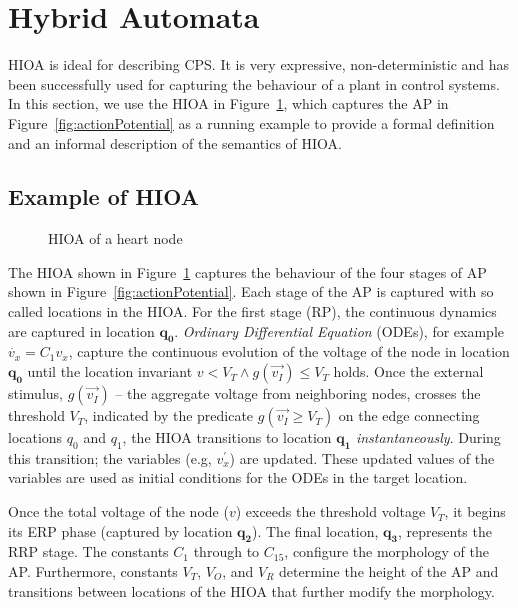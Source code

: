 \section{Hybrid Automata}
\label{sec:HA}


\acf{HIOA} is ideal for describing \ac{CPS}. It is very expressive,
non-deterministic and has been successfully used for capturing the
behaviour of a plant in control systems.  In this section, we use the
\ac{HIOA} in Figure~\ref{fig:heartCellHA}, which captures the \ac{AP} in
Figure~\ref{fig:actionPotential} as a running example to provide a
formal definition and an informal description of the semantics of
\ac{HIOA}.



\subsection{Example of \acf{HIOA} }

\begin{figure}
  \centering
  
  \caption{\acf{HIOA} of a heart node \label{fig:heartCellHA}}
\end{figure}

The \ac{HIOA} shown in Figure~\ref{fig:heartCellHA} captures the
behaviour of the four stages of \ac{AP} shown in
Figure~\ref{fig:actionPotential}. Each stage of the \ac{AP} is captured
with so called locations in the \ac{HIOA}. For the first stage
(\ac{RP}), the continuous dynamics are captured in location
$\mathbf{q_0}$. \textit{Ordinary Differential Equation} (ODEs), for
example \mbox{$\dot{v_{x}} = C_{1}v_{x}$}, capture the continuous
evolution of the voltage of the node in location $\mathbf{q_{0}}$ until
the location invariant $v < V_{T} \wedge g(\vec{v_{I}}) \leq V_{T}$
holds. Once the external stimulus, $g(\vec{v_{I}})$ -- the aggregate
voltage from neighboring nodes, crosses the threshold $V_{T}$, indicated
by the predicate \mbox{$g(\vec{v_{I}} \geq V_{T})$} on the edge
connecting locations $q_{0}$ and $q_{1}$, the \ac{HIOA} transitions to
location $\mathbf{q_{1}}$ \textit{instantaneously}. During this
transition; the variables (e.g, $v^{\prime}_{x}$) are updated. These
updated values of the variables are used as initial conditions for the
ODEs in the target location.

Once the total voltage of the node ($v$) exceeds the threshold voltage
$V_{T}$, it begins its \ac{ERP} phase (captured by location
$\mathbf{q_2}$). The final location, $\mathbf{q_3}$, represents the
\ac{RRP} stage.  The constants $C_1$ through to $C_{15}$, configure the
morphology of the \ac{AP}. Furthermore, constants $V_T$, $V_O$, and
$V_R$ determine the height of the \ac{AP} and transitions between
locations of the \ac{HIOA} that further modify the morphology.

